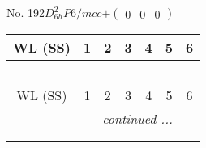 \documentclass[fleqn,9pt,landscape]{jsarticle}
\begin{document}
\newpage
No. 192\quad$D_{6h}^{2}$\quad$P6/mcc$\quad[ hexagonal ]\quad$+\begin{pmatrix} 0 & 0 & 0 \end{pmatrix}$
\begin{center}
\renewcommand{\arraystretch}{1.2}
\begin{longtable}{ccccccc}
 \hline \hline
WL (SS) & 1 & 2 & 3 & 4 & 5 & 6 \\ \hline \endfirsthead

\multicolumn{6}{l}{\tablename\ \thetable{}} \\
 \hline \hline
WL (SS) & 1 & 2 & 3 & 4 & 5 & 6 \\ \hline \endhead

 \hline \hline
\multicolumn{6}{r}{\footnotesize\it continued ...} \\ \endfoot

 \hline \hline
\multicolumn{6}{r}{} \\ \endlastfoot


\end{longtable}
\end{center}
\end{document}
